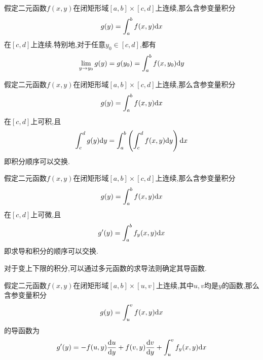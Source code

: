 \documentclass{ctexart}
\begin{document}
\pagestyle{empty}
\begin{center}\large{}\end{center}
\begin{formal}[连续性]
    假定二元函数$f(x,y)$在闭矩形域$[a,b]\times[c,d]$上连续,那么含参变量积分
    \[g(y)=\int_a^bf(x,y)\mathrm{d} x\]
    在$[c,d]$上连续.特别地,对于任意$y_0\in[c,d]$,都有
    \[\lim_{y\to y_0}g(y)=g(y_0)=\int_a^bf(x,y_0)\mathrm{d} y\]

\end{formal}
\begin{formal}[可积性]
    假定二元函数$f(x,y)$在闭矩形域$[a,b]\times[c,d]$上连续,那么含参变量积分
    \[g(y)=\int_a^bf(x,y)\mathrm{d} x\]
    在$[c,d]$上可积,且
    \[\int_c^d g(y)\mathrm{d} y=\int_a^b\left(\int_c^d f(x,y)\mathrm{d} y\right)\mathrm{d} x\]
    即积分顺序可以交换.

\end{formal}
\begin{formal}[可微性]
    假定二元函数$f(x,y)$在闭矩形域$[a,b]\times[c,d]$上连续,那么含参变量积分
    \[g(y)=\int_a^bf(x,y)\mathrm{d} x\]
    在$[c,d]$上可微,且
    \[g'(y)=\int_a^b f_y(x,y)\mathrm{d} x\]
    即求导和积分的顺序可以交换.

\end{formal}
对于变上下限的积分,可以通过多元函数的求导法则确定其导函数.
\begin{formal}[变上限含参积分的求导方法]
    假定二元函数$f(x,y)$在闭矩形域$[a,b]\times[u,v]$上连续,其中$u,v$均是$y$的函数,那么含参变量积分
    \[g(y)=\int_u^vf(x,y)\mathrm{d} x\]
    的导函数为
    \[g'(y)=-f(u,y)\dfrac{\mathrm{d} u}{\mathrm{d} y}+f(v,y)\dfrac{\mathrm{d} v}{\mathrm{d} y}+\int_u^vf_y(x,y)\mathrm{d} x\]
    
\end{formal}
\end{document}
